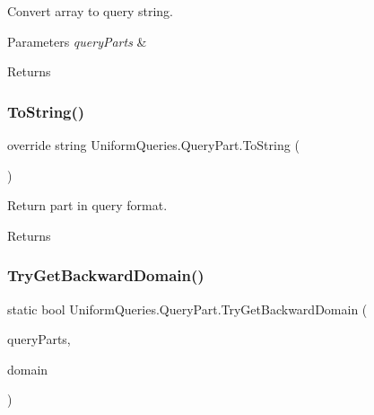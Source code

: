 Convert array to query string. 


\begin{DoxyParams}{Parameters}
{\em query\+Parts} & \\
\hline
\end{DoxyParams}
\begin{DoxyReturn}{Returns}

\end{DoxyReturn}
\mbox{\label{struct_uniform_queries_1_1_query_part_acf5597530f693df3804fc2e638805245}} 
\subsubsection{\texorpdfstring{To\+String()}{ToString()}}
{\footnotesize\ttfamily override string Uniform\+Queries.\+Query\+Part.\+To\+String (\begin{DoxyParamCaption}{ }\end{DoxyParamCaption})}



Return part in query format. 

\begin{DoxyReturn}{Returns}

\end{DoxyReturn}
\mbox{\label{struct_uniform_queries_1_1_query_part_accd3b435809c426dd92456ffee0a996d}} 
\subsubsection{\texorpdfstring{Try\+Get\+Backward\+Domain()}{TryGetBackwardDomain()}}
{\footnotesize\ttfamily static bool Uniform\+Queries.\+Query\+Part.\+Try\+Get\+Backward\+Domain (\begin{DoxyParamCaption}\item[{\mbox{\hyperlink{struct_uniform_queries_1_1_query_part}{Query\+Part}} \mbox{[}$\,$\mbox{]}}]{query\+Parts,  }\item[{out string}]{domain }\end{DoxyParamCaption})\hspace{0.3cm}{\ttfamily [static]}}



